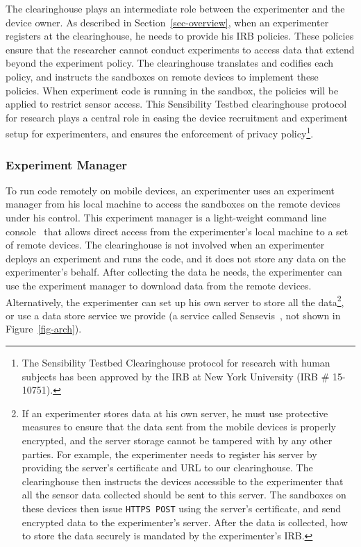 The clearinghouse
plays an intermediate role between the experimenter and 
the device owner.
As described in Section~\ref{sec-overview}, when an 
experimenter registers at the clearinghouse, he
needs to provide his IRB policies. These policies ensure that
the researcher cannot conduct experiments to access data that
extend beyond the experiment policy. The clearinghouse 
translates and codifies each policy, and instructs the 
sandboxes on remote devices to implement these policies. 
When experiment code is running in the sandbox, the 
policies will be applied to restrict %
sensor access. This Sensibility Testbed
clearinghouse protocol for research plays a central role in
easing the device recruitment and experiment setup for experimenters, 
and ensures the enforcement
of privacy policy\footnote{\scriptsize The Sensibility Testbed Clearinghouse
protocol for research with human subjects has been approved by
the IRB at New York University (IRB \# 15-10751).}. 

\subsubsection{Experiment Manager}\label{sec-emt}

To run code remotely on mobile devices, an experimenter uses an
experiment manager from his local machine 
to access the sandboxes on the remote devices under his control. 
This experiment manager is a light-weight command line 
console~\cite{demo-kit} that allows direct access from the 
experimenter's local machine to a set of remote devices. 
The clearinghouse is not involved when an experimenter deploys 
an experiment and runs the code, and it does not store any
data on the experimenter's behalf. After collecting the data he needs, the
experimenter can use the experiment manager to download data from the remote devices. 
Alternatively, the experimenter can set up his own server to store all 
the data\footnote{\scriptsize
If an experimenter stores data at his own server, he must use protective
measures to ensure that the data sent from the mobile devices is
properly encrypted, and the server storage cannot be tampered
with by any other parties. For example, the experimenter needs to register
his server by providing the server's certificate and URL to our
clearinghouse. The clearinghouse then instructs the devices
accessible to the experimenter that all the sensor data collected should be
sent to this server. The sandboxes on these devices then issue
\texttt{HTTPS POST} using the server's certificate, and send encrypted
data to the experimenter's server. After the data is collected, how to store
the data securely is mandated by the experimenter's IRB.}, or use a data 
store service we provide (a service called Sensevis~\cite{sensevis}, 
not shown in Figure~\ref{fig-arch}).

